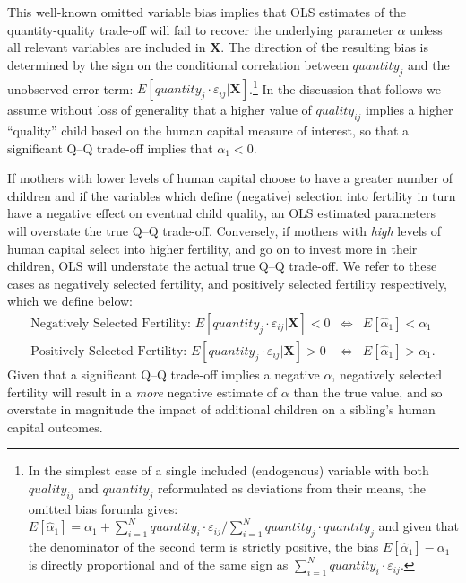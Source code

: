 \documentclass[subeqn]{article}
\begin{document}
\begin{spacing}{1.4}
This well-known omitted variable bias implies that OLS estimates of
the quantity-quality trade-off will fail to recover the underlying parameter
$\alpha$ unless all relevant variables are included in $\bm{X}$. The direction
of the resulting bias is determined by the sign on the conditional correlation
between $quantity_j$ and the unobserved error term:
$E[quantity_{j}\cdot\varepsilon_{ij}|\bm{X}]$.\footnote{In the simplest case
  of a single included (endogenous) variable with both $quality_{ij}$ and
  $quantity_j$ reformulated as deviations from their means, the omitted bias
  forumla gives:
  $
  E[\hat\alpha_1]=\alpha_1+\sum_{i=1}^N quantity_i\cdot\varepsilon_{ij}/\sum_{i=1}^N quantity_j\cdot quantity_j
  $
  and given that the denominator of the second term is strictly positive, the
  bias $E[\hat\alpha_1]-\alpha_1$ is directly proportional and of the same
  sign as $\sum_{i=1}^N quantity_i\cdot\varepsilon_{ij}$.
}
In the discussion that follows we assume without loss of generality that a higher
value of $quality_{ij}$ implies a higher ``quality'' child based on the human capital
measure of interest, so that a significant Q--Q trade-off implies that $\alpha_1<0$.


If mothers with lower levels of human capital choose to have a greater number of
children and if the variables which define (negative) selection into fertility in turn
have a negative effect on eventual child quality, an OLS estimated parameters will
overstate the true Q--Q trade-off.  Conversely, if mothers with \emph{high} levels
of human capital select into higher fertility, and go on to invest more in their
children, OLS will understate the actual true Q--Q trade-off.  We refer to these
cases as negatively selected fertility, and positively selected fertility respectively,
which we define below:
\begin{eqnarray}
  \text{Negatively Selected Fertility:\ \ \ } E[quantity_{j}\cdot\varepsilon_{ij}|\bm{X}] < 0 &\Leftrightarrow& E[\hat\alpha_1] < \alpha_1 \nonumber \\
  \text{Positively Selected Fertility:\ \ \ }  E[quantity_{j}\cdot\varepsilon_{ij}|\bm{X}] > 0 &\Leftrightarrow& E[\hat\alpha_1] > \alpha_1. \nonumber
\end{eqnarray}
Given that a significant Q--Q trade-off implies a negative $\alpha$, negatively
selected fertility will result in a \emph{more} negative estimate of $\alpha$
than the true value, and so overstate in magnitude the impact of additional children
on a sibling's human capital outcomes.


\end{spacing}
\end{document}
